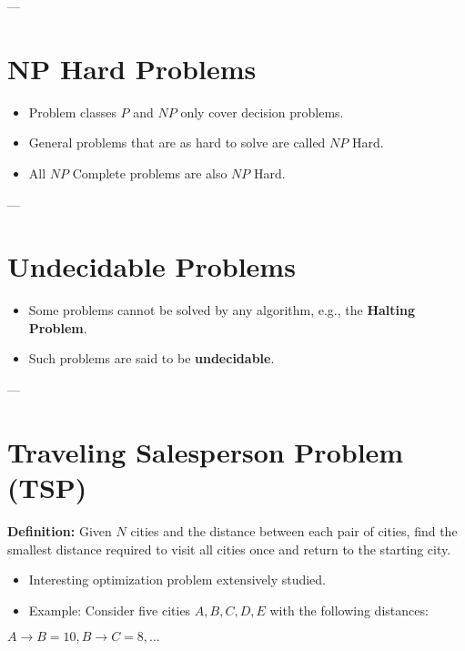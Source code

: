 \documentclass[a4paper,12pt]{article}
\begin{document}
---

\section*{NP Hard Problems}

\begin{itemize}[label=$\bullet$]
    \item Problem classes \(P\) and \(NP\) only cover decision problems.
    \item General problems that are as hard to solve are called \(NP\) Hard.
    \item All \(NP\) Complete problems are also \(NP\) Hard.
\end{itemize}

---

\section*{Undecidable Problems}

\begin{itemize}[label=$\bullet$]
    \item Some problems cannot be solved by any algorithm, e.g., the \textbf{Halting Problem}.
    \item Such problems are said to be \textbf{undecidable}.
\end{itemize}

---

\section*{Traveling Salesperson Problem (TSP)}

\textbf{Definition:} Given \(N\) cities and the distance between each pair of cities, find the smallest distance required to visit all cities once and return to the starting city.

\begin{itemize}[label=$\bullet$]
    \item Interesting optimization problem extensively studied.
    \item Example: Consider five cities \(A, B, C, D, E\) with the following distances:
\end{itemize}

\begin{tcolorbox}[colback=blue!5, colframe=blue!75!black, title=Distance Matrix]
    \( A \to B = 10, B \to C = 8, \dots \)
\end{tcolorbox}
\end{document}
